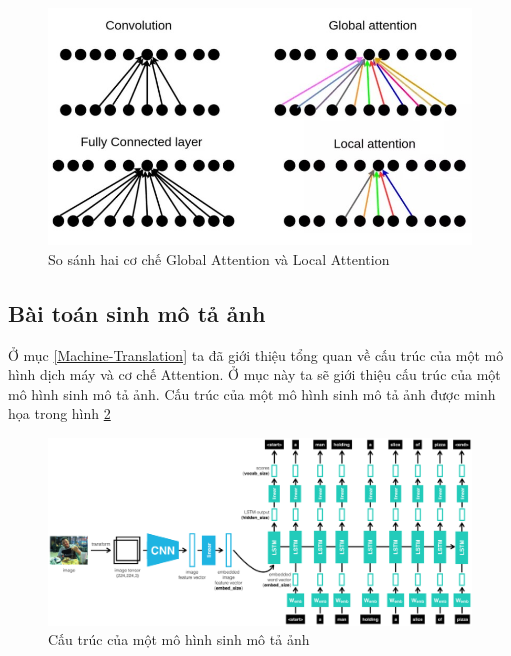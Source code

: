 \documentclass[14pt, a4paper]{article}
\numberwithin{equation}{section}
\numberwithin{algorithm}{section}
\numberwithin{figure}{section}
\numberwithin{table}{section}
\numberwithin{dl}{section}
\numberwithin{md}{section}
\numberwithin{bd}{section}
\numberwithin{dn}{section}
\numberwithin{hq}{section}
\begin{document}
    \begin{figure}[h!] \centering

        \includegraphics[scale=0.4]{Local_Global_Attention.jpg}
        \caption{So sánh hai cơ chế Global Attention và Local Attention}
    
        \label{fig:Local_Global_Attention}
    \end{figure}

    \subsection{Bài toán sinh mô tả ảnh}

    Ở mục \ref{Machine-Translation} ta đã giới thiệu tổng quan về cấu trúc của một mô hình dịch máy và cơ chế Attention. 
    Ở mục này ta sẽ giới thiệu cấu trúc của một mô hình sinh mô tả ảnh. 
    Cấu trúc của một mô hình sinh mô tả ảnh được minh họa trong hình \ref{fig:Image_Captioning_Architecture}

    \begin{figure}[h!] \centering

        \includegraphics[scale=0.25]{Image_Captioning_Architecture.png}
        \caption{Cấu trúc của một mô hình sinh mô tả ảnh}
    
        \label{fig:Image_Captioning_Architecture}
    \end{figure}
\end{document}
